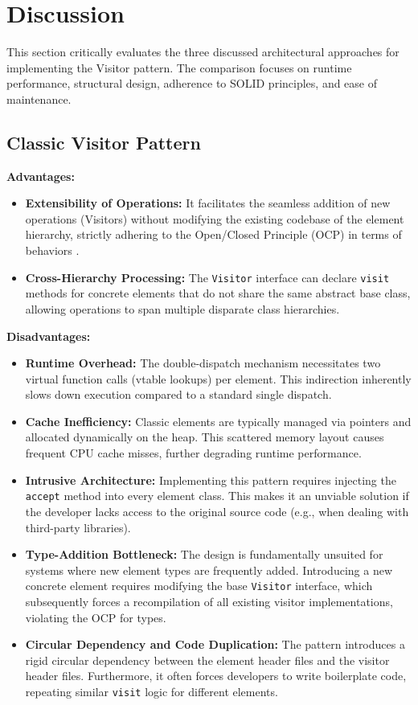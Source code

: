 \section{Discussion}
\label{sec:discussion}

This section critically evaluates the three discussed architectural approaches for implementing the Visitor pattern. The comparison focuses on runtime performance, structural design, adherence to SOLID principles, and ease of maintenance.

\subsection{Classic Visitor Pattern}

\textbf{Advantages:}
\begin{itemize}
    \item \textbf{Extensibility of Operations:} It facilitates the seamless addition of new operations (Visitors) without modifying the existing codebase of the element hierarchy, strictly adhering to the Open/Closed Principle (OCP) in terms of behaviors \cite{gof1994}.
    \item \textbf{Cross-Hierarchy Processing:} The \texttt{Visitor} interface can declare \texttt{visit} methods for concrete elements that do not share the same abstract base class, allowing operations to span multiple disparate class hierarchies.
\end{itemize}

\textbf{Disadvantages:}
\begin{itemize}
    \item \textbf{Runtime Overhead:} The double-dispatch mechanism necessitates two virtual function calls (vtable lookups) per element. This indirection inherently slows down execution compared to a standard single dispatch.
    \item \textbf{Cache Inefficiency:} Classic elements are typically managed via pointers and allocated dynamically on the heap. This scattered memory layout causes frequent CPU cache misses, further degrading runtime performance.
    \item \textbf{Intrusive Architecture:} Implementing this pattern requires injecting the \texttt{accept} method into every element class. This makes it an unviable solution if the developer lacks access to the original source code (e.g., when dealing with third-party libraries).
    \item \textbf{Type-Addition Bottleneck:} The design is fundamentally unsuited for systems where new element types are frequently added. Introducing a new concrete element requires modifying the base \texttt{Visitor} interface, which subsequently forces a recompilation of all existing visitor implementations, violating the OCP for types.
    \item \textbf{Circular Dependency and Code Duplication:} The pattern introduces a rigid circular dependency between the element header files and the visitor header files. Furthermore, it often forces developers to write boilerplate code, repeating similar \texttt{visit} logic for different elements.
\end{itemize}


